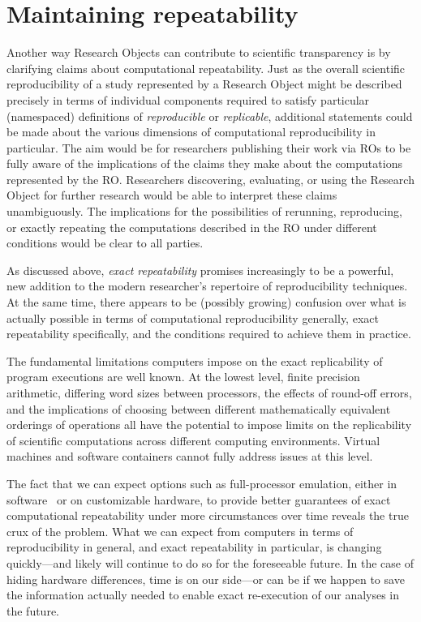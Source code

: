 \section{Maintaining repeatability}\label{sec-limitations}

Another way Research Objects can contribute to scientific transparency is by
	clarifying claims about computational repeatability.
Just as the overall scientific reproducibility of a study represented by a Research Object
	might be described precisely in terms of individual components required to
	satisfy particular (namespaced) definitions of \emph{reproducible} or \emph{replicable},
	additional statements could be made about the various dimensions of computational
	reproducibility in particular.
The aim would be for researchers publishing their work via ROs to be fully aware
	of the implications of the claims they make about the computations represented
	by the RO.
Researchers discovering, evaluating, or using the Research Object for further research
	 would be able to interpret these claims unambiguously.
The implications for the possibilities of rerunning, reproducing, or exactly repeating the
	computations described in the RO under different conditions would be clear
	to all parties.

As discussed above, \emph{exact repeatability} promises increasingly to be a powerful,
	new addition to the modern researcher's repertoire of reproducibility techniques.
At the same time, there appears to be (possibly growing) confusion over what is actually
	possible in terms of computational reproducibility generally, exact repeatability
	specifically, and the conditions required to achieve them in practice.

The fundamental limitations computers impose on the exact replicability of program executions
	are well known.
At the lowest level, finite precision arithmetic, differing word sizes between processors,
	the effects of round-off errors, and the implications of choosing between different
	mathematically equivalent orderings of operations all have the potential to
	impose limits on the replicability of scientific computations across different computing environments.
Virtual machines and software containers cannot fully address issues at this level.

The fact that we can expect options such as full-processor emulation, either in software~\cite{QEMU}
	or on customizable hardware,
	to provide better guarantees of exact computational repeatability under more circumstances
	over time reveals the true crux of the problem.
What we can expect from computers in terms of reproducibility in general, and exact
	repeatability in particular, is changing quickly---and likely will continue to do so for the
	foreseeable future.
In the case of hiding hardware differences, time is on our side---or can be if we happen to save the
	information actually needed to enable exact re-execution of our analyses in the future.

